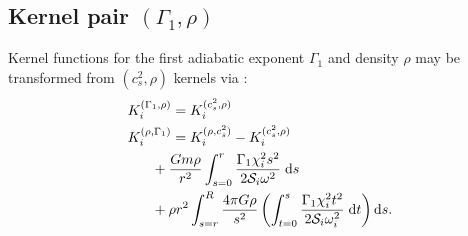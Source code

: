 \documentclass[twocolumn,twocolappendix]{aastex6}
\newcommand{\Kcsr}{K_i^{(c_s^2, \rho)}}
\newcommand{\Krcs}{K_i^{(\rho, c_s^2)}}
\newcommand{\KGr}{K_i^{(\Gamma_1,\rho)}}
\newcommand{\KrG}{K_i^{(\rho, \Gamma_1)}}
\begin{document}
\subsection{Kernel pair \texorpdfstring{$(\Gamma_1, \rho)$}{(Gamma1,rho)}}

Kernel functions for the first adiabatic exponent $\Gamma_1$ and density $\rho$ may be transformed from $(c_s^2, \rho)$ kernels via \citep[][Eqns.\ 104-105]{InversionKit}:
\begin{align}
    \KGr &= \Kcsr
\\  \KrG &= \Krcs - \Kcsr 
\notag\\&\hspace*{-5mm} + \frac{G m \rho}{r^2} \int_{s=0}^r \frac{\Gamma_1 \chi_i^2 s^2}{2 \mathcal{S}_i \omega^2} \; \text{d}s
\notag\\&\hspace*{-5mm} + \rho r^2 \int_{s=r}^R \frac{4\pi G \rho}{s^2} \left( \int_{t=0}^s \frac{\Gamma_1 \chi_i^2 t^2}{2 \mathcal{S}_i \omega_i^2} \; \text{d}t \right) \text{d}s.
\end{align}
\end{document}
